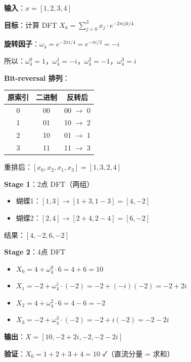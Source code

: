 \documentclass[12pt, a4paper]{ctexart}
\begin{document}
\begin{blackboard}

\textbf{输入}：$x = [1, 2, 3, 4]$

\textbf{目标}：计算 DFT $X_k = \sum_{j=0}^{3} x_j \cdot e^{-2\pi i jk/4}$

\textbf{旋转因子}：$\omega_4 = e^{-2\pi i/4} = e^{-\pi i/2} = -i$

所以：$\omega_4^0 = 1$，$\omega_4^1 = -i$，$\omega_4^2 = -1$，$\omega_4^3 = i$

\textbf{Bit-reversal 排列}：
\begin{center}
\begin{tabular}{c|c|c}
原索引 & 二进制 & 反转后 \\
\hline
0 & 00 & 00 $\to$ 0 \\
1 & 01 & 10 $\to$ 2 \\
2 & 10 & 01 $\to$ 1 \\
3 & 11 & 11 $\to$ 3 \\
\end{tabular}
\end{center}

重排后：$[x_0, x_2, x_1, x_3] = [1, 3, 2, 4]$

\textbf{Stage 1}：2点 DFT（两组）
\begin{itemize}
    \item 蝴蝶1：$[1, 3] \to [1+3, 1-3] = [4, -2]$
    \item 蝴蝶2：$[2, 4] \to [2+4, 2-4] = [6, -2]$
\end{itemize}
结果：$[4, -2, 6, -2]$

\textbf{Stage 2}：4点 DFT
\begin{itemize}
    \item $X_0 = 4 + \omega_4^0 \cdot 6 = 4 + 6 = 10$
    \item $X_1 = -2 + \omega_4^1 \cdot (-2) = -2 + (-i)(-2) = -2 + 2i$
    \item $X_2 = 4 + \omega_4^2 \cdot 6 = 4 - 6 = -2$
    \item $X_3 = -2 + \omega_4^3 \cdot (-2) = -2 + i(-2) = -2 - 2i$
\end{itemize}

\textbf{输出}：$X = [10, -2+2i, -2, -2-2i]$

\textbf{验证}：$X_0 = 1+2+3+4 = 10$ ✓（直流分量 = 求和）

\end{blackboard}
\end{document}
